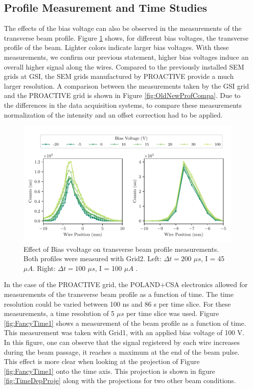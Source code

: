 \subsection{Profile Measurement and Time Studies}
\label{sec:ProfileMeas}

The effects of the bias voltage can also be observed in the measurements of the transverse beam profile. Figure \ref{fig:BeamProfileBiasEffect} shows, for different bias voltages, the transverse profile of the beam. Lighter colors indicate larger bias voltages. With these measurements, we confirm our previous statement, higher bias voltages induce an overall higher signal along the wires. Compared to the previously installed SEM grids at GSI, the SEM grids manufactured by PROACTIVE provide a much larger resolution. A comparison between the measurements taken by the GSI grid and the PROACTIVE grid is shown in Figure \ref{fig:OldNewProfCompa}. Due to the differences in the data acquisition systems, to compare these measurements normalization of the intensity and an offset correction had to be applied.
\vspace{-0.4cm}
\begin{figure}[h]
    \centering
    \includegraphics[width=1.0\columnwidth]{BeamProfileBiasEffect/SemGridProfileBiasCompa.pdf}
    \caption{Effect of Bias vvoltage on transverse beam profile measurements. Both profiles were measured with Grid2. Left: $\Delta t = 200 $ $\mu s$, I = 45 $\mu A$. Right:  $\Delta t = 100 $ $\mu s$, I = 100 $\mu A$ . }
    \label{fig:BeamProfileBiasEffect}
\end{figure}

In the case of the PROACTIVE grid, the POLAND+CSA electronics \parencite[]{ref:ElectronicsSEMgsi} allowed for measurements of the transverse beam profile as a function of time. The time resolution could be varied between 100 ns and 86 s per time slice. For these measurements, a time resolution of 5 $\mu s$ per time slice was used. Figure \ref{fig:FancyTime1} shows a measurement of the beam profile as a function of time. This measurement was taken with Grid1, with an applied bias voltage of 100 V. In this figure, one can observe that the signal registered by each wire increases during the beam passage, it reaches a maximum at the end of the beam pulse. This effect is more clear when looking at the projection of Figure \ref{fig:FancyTime1}  onto the time axis. This projection is shown in figure \ref{fig:TimeDepProje} along with the projections for two other beam conditions. 

